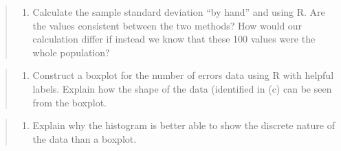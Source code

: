 \documentclass[
]{article}
\providecommand{\tightlist}{%
  \setlength{\itemsep}{0pt}\setlength{\parskip}{0pt}}
\begin{document}
\begin{quote}
\begin{enumerate}
\def\labelenumi{\alph{enumi}.}
\setcounter{enumi}{4}
\tightlist
\item
  Calculate the sample standard deviation ``by hand'' and using R. Are
  the values consistent between the two methods? How would our
  calculation differ if instead we know that these 100 values were the
  whole population?
\end{enumerate}
\end{quote}

\begin{quote}
\begin{enumerate}
\def\labelenumi{\alph{enumi}.}
\setcounter{enumi}{5}
\tightlist
\item
  Construct a boxplot for the number of errors data using R with helpful
  labels. Explain how the shape of the data (identified in (c) can be
  seen from the boxplot.
\end{enumerate}
\end{quote}

\begin{quote}
\begin{enumerate}
\def\labelenumi{\alph{enumi}.}
\setcounter{enumi}{6}
\tightlist
\item
  Explain why the histogram is better able to show the discrete nature
  of the data than a boxplot.
\end{enumerate}
\end{quote}
\end{document}
